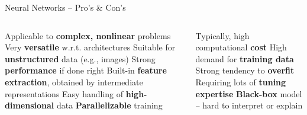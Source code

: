 \begin{frame}{Neural Networks -- Pro's \& Con's}

\footnotesize

\begin{columns}[onlytextwidth]
  \begin{column}{0.5\textwidth}
    \footnotesize
    \begin{itemize}
      \positem Applicable to \textbf{complex, nonlinear} problems
      \positem Very \textbf{versatile} w.r.t. architectures
      \positem Suitable for \textbf{unstructured} data (e.g., images)
      \positem Strong \textbf{performance} if done right
      \positem Built-in \textbf{feature extraction}, obtained by intermediate
      representations
      \positem Easy handling of \textbf{high-dimensional} data
      \positem \textbf{Parallelizable} training 
    \end{itemize}
  \end{column}

  \begin{column}{0.5\textwidth}
    \footnotesize
    \begin{itemize}
      \negitem Typically, high computational \textbf{cost}
      \negitem High demand for \textbf{training data} 
      \negitem Strong tendency to \textbf{overfit}
      \negitem Requiring lots of \textbf{tuning expertise} 
      \negitem \textbf{Black-box} model -- hard to interpret or explain
    \end{itemize}
  \end{column}
\end{columns}

\vfill

\small


\end{frame}


